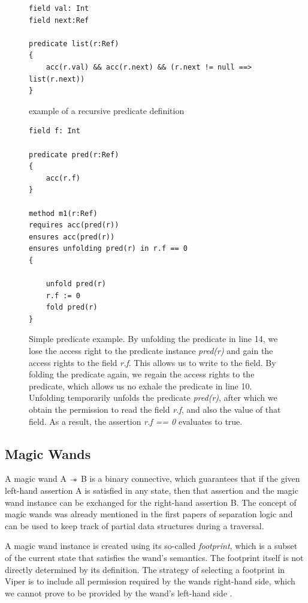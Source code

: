 \documentclass[12pt]{article}
\begin{document}
\begin{figure}[h]
  \centering
\begin{lstlisting}
field val: Int
field next:Ref

predicate list(r:Ref)
{
    acc(r.val) && acc(r.next) && (r.next != null ==> list(r.next))
}
\end{lstlisting}
\caption[recursive predicate]
   {example of a recursive predicate definition}
\label{recursivePredicate}
\end{figure}


\begin{figure}[h]
  \centering
\begin{lstlisting}
field f: Int

predicate pred(r:Ref)
{
    acc(r.f)
}

method m1(r:Ref)
requires acc(pred(r))
ensures acc(pred(r))
ensures unfolding pred(r) in r.f == 0
{

    unfold pred(r)
    r.f := 0
    fold pred(r)
}
\end{lstlisting}
\caption[predicate example]
   {Simple predicate example. By unfolding the predicate in line 14, we lose the access right to the predicate instance \textit{pred(r)} and gain the access rights to the field \textit{r.f}. This allows us to write to the field. By folding the predicate again, we regain the access rights to the predicate, which allows us no exhale the predicate in line 10. Unfolding temporarily unfolds the predicate \textit{pred(r)}, after which we obtain the permission to read the field \textit{r.f}, and also the value of that field. As a result, the assertion \textit{r.f == 0} evaluates to true.}
\label{predicateExample}
\end{figure}

\subsection{Magic Wands}
A magic wand A \(\mathbin{-\!\!*}\) B is a binary connective, which guarantees that if the given left-hand assertion A is satisfied in any state, then that assertion and the magic wand instance can be exchanged for the right-hand assertion B. The concept of magic wands was already mentioned in the first papers of separation logic \cite{reynolds2002separation} and can be used to keep track of partial data structures during a traversal.

A magic wand instance is created using its so-called \textit{footprint}, which is a subset of the current state that satisfies the wand's semantics. The footprint itself is not directly determined by its definition. The strategy of selecting a footprint in Viper is to include all permission required by the wands right-hand side, which we cannot prove to be provided by the wand's left-hand side \cite{magicwand}.
\end{document}
